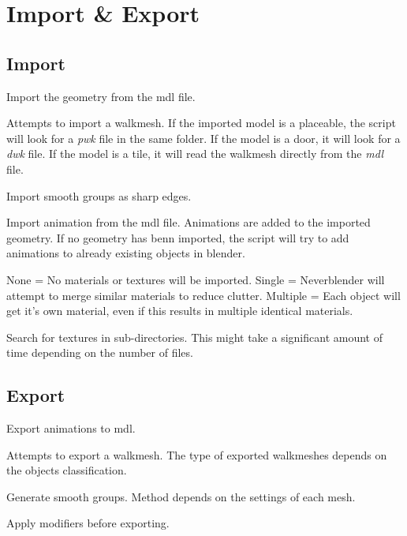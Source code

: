 \chapter{Import \& Export}

\section{Import}

\begin{description}[leftmargin=13em,style=nextline]
    \item[Import Geometry] Import the geometry from the mdl file.
    \item[Import Walkmesh] Attempts to import a walkmesh. If the imported model is a placeable, the script will look for a {\textit{pwk}} file in the same folder. If the model is a door, it will look for a {\textit{dwk}} file. If the model is a tile, it will read the walkmesh directly from the {\textit{mdl}} file.
    \item[Import Smooth Groups] Import smooth groups as sharp edges.
    \item[Import Animations] Import animation from the mdl file. Animations are added to the imported geometry. If no geometry has benn imported, the script will try to add animations to already existing objects in blender.
    \item[Materials] None = No materials or textures will be imported. Single = Neverblender will attempt to merge similar materials to reduce clutter. Multiple = Each object will get it's own material, even if this results in multiple identical materials.
    \item[Image Search] Search for textures in sub-directories. This might take a significant amount of time depending on the number of files.
\end{description}

\section{Export}

\begin{description}[leftmargin=12em,style=nextline]
    \item[Export Animations] Export animations to mdl.
    \item[Export Walkmesh] Attempts to export a walkmesh. The type of exported walkmeshes depends on the objects classification.
    \item[Export Smooth Groups] Generate smooth groups. Method depends on the settings of each mesh.
    \item[Apply Modifiers] Apply modifiers before exporting.
\end{description}
